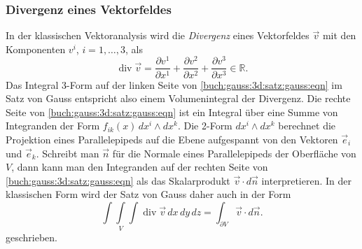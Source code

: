 %
%
\subsubsection{Divergenz eines Vektorfeldes}
In der klassischen Vektoranalysis wird die {\em Divergenz} eines Vektorfeldes
%
$\vec{v}$ mit den Komponenten $v^i$, $i=1,\dots,3$, als
\[
\operatorname{div}\vec{v}
=
\frac{\partial v^1}{\partial x^1}
+
\frac{\partial v^2}{\partial x^2}
+
\frac{\partial v^3}{\partial x^3}
\in
\mathbb{R}.
\]
Das Integral 3-Form auf der linken Seite von
\eqref{buch:gauss:3d:satz:gauss:eqn}
im Satz von Gauss entspricht also einem Volumenintegral
der Divergenz.
Die rechte Seite von \eqref{buch:gauss:3d:satz:gauss:eqn}
ist ein Integral über eine Summe von Integranden der Form
$f_{ik}(x)\,dx^i\wedge dx^k$.
Die 2-Form $dx^i\wedge dx^k$ berechnet die Projektion eines
Parallelepipeds auf die Ebene aufgespannt von den Vektoren
$\vec{e}_i$ und $\vec{e}_k$.
Schreibt man $\vec{n}$ für die Normale eines Parallelepipeds
der Oberfläche von $V$, dann kann man den Integranden
auf der rechten Seite von \eqref{buch:gauss:3d:satz:gauss:eqn}
als das Skalarprodukt $\vec{v}\cdot d\vec{n}$ interpretieren.
In der klassischen Form wird der Satz von Gauss daher auch
in der Form
\[
\underset{V}{\int\!\!\!\int\!\!\!\int}
\operatorname{div}\vec{v}
\,dx\,dy\,dz
=
\int_{\partial V}\vec{v}\cdot d\vec{n}.
\]
geschrieben.


